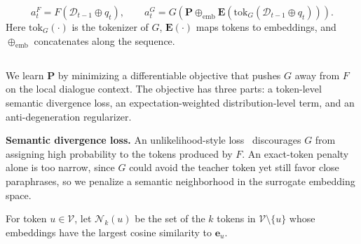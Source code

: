 \[
a_t^{F}=F\!\left(\mathcal D_{t-1}\oplus q_t\right),
\qquad
 a_t^{G}=G\!\left(\mathbf P\oplus_{\mathrm{emb}}
\mathbf E(\mathrm{tok}_G(\mathcal D_{t-1}\oplus q_t))\right).
\]
Here $\mathrm{tok}_G(\cdot)$ is the tokenizer of $G$, $\mathbf E(\cdot)$ maps tokens to embeddings, and $\oplus_{\mathrm{emb}}$ concatenates along the sequence. 

\subsection{}\label{sec:mining}

We learn $\mathbf P$ by minimizing a differentiable objective that pushes $G$ away from $F$ on the local dialogue context. The objective has three parts: a token-level semantic divergence loss, an expectation-weighted distribution-level term, and an anti-degeneration regularizer.

\textbf{Semantic divergence loss.}
An unlikelihood-style loss~\citep{welleck2019neural} discourages $G$ from assigning high probability to the tokens produced by $F$. An exact-token penalty alone is too narrow, since $G$ could avoid the teacher token yet still favor close paraphrases, so we penalize a semantic neighborhood in the surrogate embedding space.

\begin{definition}
For token $u\in\mathcal V$, let $\mathcal N_k(u)$ be the set of the $k$ tokens in $\mathcal V\setminus\{u\}$ whose embeddings have the largest cosine similarity to $\boldsymbol e_u$.
\end{definition}


